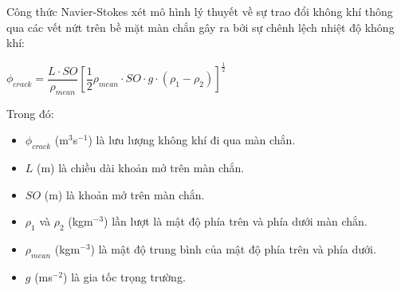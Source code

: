 \documentclass[a4paper]{article}
\begin{document}
	    Công thức Navier-Stokes xét mô hình lý thuyết về sự trao đổi không khí thông qua các vết nứt trên bề mặt màn chắn gây ra bởi sự chênh lệch nhiệt độ không khí:
	    \begin{center}
	        $\phi_{crack} = \dfrac{L\cdot SO}{\rho_{mean}}\left[\dfrac{1}{2}\rho_{mean}\cdot SO \cdot g \cdot (\rho_{1} - \rho_{2})\right]^{\frac{1}{2}}$
	    \end{center}
	    Trong đó:
	    \begin{itemize}
	        \item $\phi_{crack}$ (m$^3$s$^{-1}$) là lưu lượng không khí đi qua màn chắn.
	        \item $L$ (m) là chiều dài khoản mở trên màn chắn.
	        \item $SO$ (m) là khoản mở trên màn chắn.
	        \item $\rho_{1}$ và $\rho_{2}$ (kgm$^{-3}$) lần lượt là mật độ phía trên và phía dưới màn chắn.
	        \item $\rho_{mean}$ (kgm$^{-3}$) là mật độ trung bình của mật độ phía trên và phía dưới.
	        \item $g$ (ms$^{-2}$) là gia tốc trọng trường.
	    \end{itemize}
	    
	    \vspace{5mm}
	    
\end{document}
